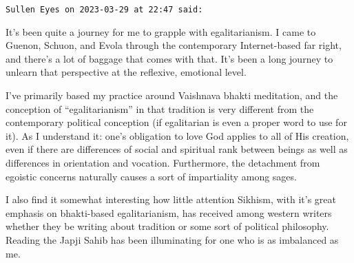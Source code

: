 \begin{footnotesize}
\begin{sffamily}
\hfill

\texttt{Sullen Eyes on 2023-03-29 at 22:47 said:}

It's been quite a journey for me to grapple with egalitarianism. I came to Guenon, Schuon, and Evola through the contemporary Internet-based far right, and there's a lot of baggage that comes with that. It's been a long journey to unlearn that perspective at the reflexive, emotional level.

I've primarily based my practice around Vaishnava bhakti meditation, and the conception of ``egalitarianism'' in that tradition is very different from the contemporary political conception (if egalitarian is even a proper word to use for it). As I understand it: one's obligation to love God applies to all of His creation, even if there are differences of social and spiritual rank between beings as well as differences in orientation and vocation. Furthermore, the detachment from egoistic concerns naturally causes a sort of impartiality among sages.

I also find it somewhat interesting how little attention Sikhism, with it's great emphasis on bhakti-based egalitarianism, has received among western writers whether they be writing about tradition or some sort of political philosophy. Reading the Japji Sahib has been illuminating for one who is as imbalanced as me.

\end{sffamily}
\end{footnotesize}

